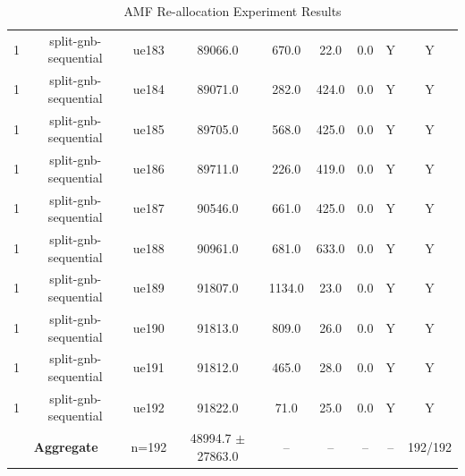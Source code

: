 \begin{table}[ht]
\begin{tabular}{|c|c|c|c|c|c|c|c|c|}
1 & split-gnb-sequential & ue183 & 89066.0 & 670.0 & 22.0 & 0.0 & Y & Y \\
1 & split-gnb-sequential & ue184 & 89071.0 & 282.0 & 424.0 & 0.0 & Y & Y \\
1 & split-gnb-sequential & ue185 & 89705.0 & 568.0 & 425.0 & 0.0 & Y & Y \\
1 & split-gnb-sequential & ue186 & 89711.0 & 226.0 & 419.0 & 0.0 & Y & Y \\
1 & split-gnb-sequential & ue187 & 90546.0 & 661.0 & 425.0 & 0.0 & Y & Y \\
1 & split-gnb-sequential & ue188 & 90961.0 & 681.0 & 633.0 & 0.0 & Y & Y \\
1 & split-gnb-sequential & ue189 & 91807.0 & 1134.0 & 23.0 & 0.0 & Y & Y \\
1 & split-gnb-sequential & ue190 & 91813.0 & 809.0 & 26.0 & 0.0 & Y & Y \\
1 & split-gnb-sequential & ue191 & 91812.0 & 465.0 & 28.0 & 0.0 & Y & Y \\
1 & split-gnb-sequential & ue192 & 91822.0 & 71.0 & 25.0 & 0.0 & Y & Y \\
\multicolumn{2}{|c|}{\textbf{Aggregate}} & n=192 & 48994.7 $\pm$ 27863.0 & -- & -- & -- & -- & 192/192 \\
\hline
\end{tabular}
\caption{AMF Re-allocation Experiment Results}
\label{tab:amf_realloc}
\end{table}
